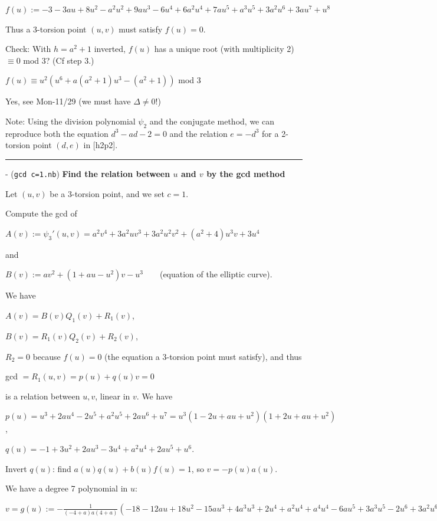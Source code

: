 \documentclass{rs}
\theoremstyle{definition}
\theoremstyle{remark}
\renewcommand{\=}{\approx}
\renewcommand{\-}{\sim}
\numberwithin{equation}{section}
\numberwithin{thm}{section}
\begin{document}
\centerline{$f(u) := -3 - 3 a u + 8 u^2 - a^2 u^2 + 9 a u^3 - 6 u^4 + 6 a^2 u^4 + 7 a u^5 +
  a^3 u^5 + 3 a^2 u^6 + 3 a u^7 + u^8$}

Thus a 3-torsion point $(u,v)$ must satisfy $f(u) = 0$.

Check: With $h = a^2 + 1$ inverted, $f(u)$ has a unique root (with multiplicity 2) $\equiv 0$ mod 3? (Cf step 3.)

$f(u) \equiv u^2 (u^6 + a (a^2 + 1) u^3 - (a^2 + 1))$ mod 3

Yes, see Mon-11/29 (we must have $\Delta \neq 0$!)

Note: Using the division polynomial $\psi_2$ and the conjugate method, we can reproduce both the equation $d^3 - a d - 2 = 0$ and the relation $e = -d^3$ for a 2-torsion point $(d,e)$ 
in [h2p2].\\

\hrule

- (\texttt{gcd c=1.nb}) \textbf{Find the relation between $u$ and $v$ by the gcd method}

Let $(u,v)$ be a 3-torsion point, and we set $c = 1$.

Compute the gcd of

\centerline{$A(v) := \psi_3'(u,v) = a^2 v^4 + 3 a^2 u v^3 + 3 a^2 u^2 v^2 + (a^2 + 4) u^3 v + 3 u^4$}
and

\centerline{$B(v) := a v^2 + (1 + au - u^2) v - u^3$~~~~(equation of the elliptic curve).}

We have

$A(v) = B(v)Q_1(v) + R_1(v)$,

$B(v) = R_1(v)Q_2(v) + R_2(v)$,

$R_2 = 0$ because $f(u) = 0$ (the equation a 3-torsion point must satisfy), and thus

\centerline{gcd $= R_1(u,v) = p(u) + q(u) v = 0$}

is a relation between $u, v$, linear in $v$. We have

$p(u) = u^3 + 2 a u^4 - 2 u^5 + a^2 u^5 + 2 a u^6 + u^7 = u^3 (1 - 2 u + a u + u^2) (1 + 2 u + a u + u^2)$,

$q(u) = -1 + 3 u^2 + 2 a u^3 - 3 u^4 + a^2 u^4 + 2 a u^5 + u^6$.

Invert $q(u)$: find $a(u)q(u) + b(u)f(u) = 1$, so $v = -p(u)a(u)$.

We have a degree 7 polynomial in $u$:

$v = g(u) := -\frac{1}{(-4 + a) a (4 + a)}(-18 - 12 a u + 18 u^2 - 15 a u^3 + 4 a^3 u^3 + 2 u^4 + a^2 u^4 + 
  a^4 u^4 - 6 a u^5 + 3 a^3 u^5 - 2 u^6 + 3 a^2 u^6 + 
  a u^7)$
\end{document}
